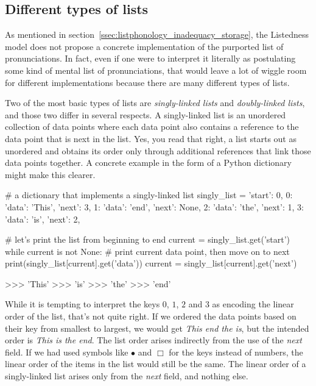 \begin{programming}
\label{sec:listphonology_code}

\subsection{Different types of lists}
\label{ssec:listphonology_code_lists}

As mentioned in section~\ref{ssec:listphonology_inadequacy_storage}, the Listedness model does not propose a concrete implementation of the purported list of pronunciations.
In fact, even if one were to interpret it literally as postulating some kind of mental list of pronunciations, that would leave a lot of wiggle room for different implementations because there are many different types of lists.

Two of the most basic types of lists are \emph{singly-linked lists} and \emph{doubly-linked lists}, and those two differ in several respects. 
A singly-linked list is an unordered collection of data points where each data point also contains a reference to the data point that is next in the list.
Yes, you read that right, a list starts out as unordered and obtains its order only through additional references that link those data points together.
A concrete example in the form of a Python dictionary might make this clearer.
%
\begin{center}
\begin{pythoncode}
    # a dictionary that implements a singly-linked list
    singly_list = {
        'start': 0,
        0: {'data': 'This',
            'next': 3},
        1: {'data': 'end',
            'next': None},
        2: {'data': 'the',
            'next': 1},
        3: {'data': 'is',
            'next': 2},
    }

    # let's print the list from beginning to end
    current = singly_list.get('start')
    while current is not None:
        # print current data point, then move on to next
        print(singly_list[current].get('data'))
        current = singly_list[current].get('next')

    >>> 'This'
    >>> 'is'
    >>> 'the'
    >>> 'end'
\end{pythoncode}
\end{center}
%
While it is tempting to interpret the keys $0$, $1$, $2$ and $3$ as encoding the linear order of the list, that's not quite right.
If we ordered the data points based on their key from smallest to largest, we would get \emph{This end the is}, but the intended order is \emph{This is the end}.
The list order arises indirectly from the use of the \emph{next} field.
If we had used symbols like $\bullet$ and $\Box$ for the keys instead of numbers, the linear order of the items in the list would still be the same.
The linear order of a singly-linked list arises only from the \emph{next} field, and nothing else.


\end{programming}
